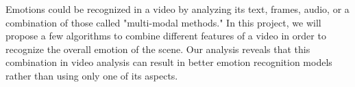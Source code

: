 

Emotions could be recognized in a video by analyzing its text, frames, audio, or a combination of those called "multi-modal methods." In this project, we will propose a few algorithms to combine different features of a video in order to recognize the overall emotion of the scene. Our analysis reveals that this combination in video analysis can result in better emotion recognition models rather than using only one of its aspects.